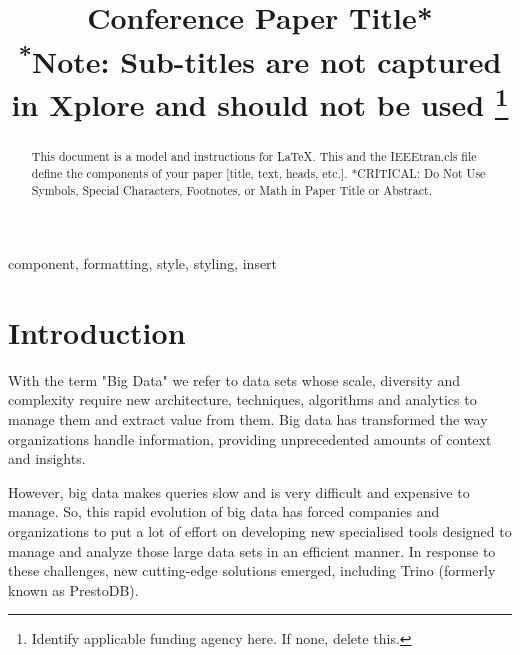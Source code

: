 \documentclass[conference]{IEEEtran}
\begin{document}
\title{Conference Paper Title*\\
{\footnotesize \textsuperscript{*}Note: Sub-titles are not captured in Xplore and
should not be used}
\thanks{Identify applicable funding agency here. If none, delete this.}
}

\author{
\and
{}
}

\maketitle

\begin{abstract}
This document is a model and instructions for \LaTeX.
This and the IEEEtran.cls file define the components of your paper [title, text, heads, etc.]. *CRITICAL: Do Not Use Symbols, Special Characters, Footnotes, 
or Math in Paper Title or Abstract.
\end{abstract}

\begin{IEEEkeywords}
component, formatting, style, styling, insert
\end{IEEEkeywords}

\section{Introduction}
With the term "Big Data" we refer to data sets whose scale, diversity and complexity require new
architecture, techniques, algorithms and analytics to manage them and extract value from them.
Big data has transformed the way organizations handle information, providing unprecedented amounts of context and insights.

However, big data makes queries slow and is very difficult and expensive to manage.
So, this rapid evolution of big data has forced companies and organizations to put a lot of effort on 
developing new specialised tools designed to manage and analyze those large data sets in an efficient manner.
In response to these challenges, new cutting-edge solutions emerged, including Trino (formerly known as PrestoDB).
\end{document}
